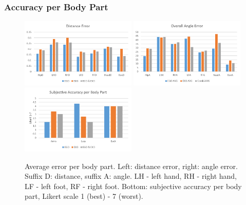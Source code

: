 \subsubsection{Accuracy per Body Part}
\label{sec:evalAccBodyPart}
\begin{figure}[H]
	\centering
	\includegraphics[width=0.49\textwidth]{figures/overallDistanceError.png}
	\includegraphics[width=0.49\textwidth]{figures/overallAngleError.png}
	\includegraphics[width=0.49\textwidth]{figures/subjectiveAccuracyPerBodyPart.png}
	\caption[Overall accuracy per body part]{Average error per body part. Left: distance error, right: angle error. Suffix D: distance, suffix A: angle. LH - left hand, RH - right hand, LF - left foot, RF - right foot.  Bottom: subjective accuracy per body part, Likert scale 1 (best) - 7 (worst).}
	\label{fig:overallError}
\end{figure}

